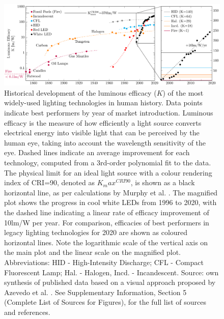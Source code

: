 \documentclass[journal=jacsat,manuscript=article]{achemso}
\begin{document}
\begin{figure}[h]
 \centering
 \includegraphics[width=\textwidth]{2_SSL_EST/article/figures/history_efficacy.pdf}
 \caption{Historical development of the luminous efficacy ($K$) of the most widely-used lighting technologies in human history. Data points indicate best performers by year of market introduction. Luminous efficacy is the measure of how efficiently a light source converts electrical energy into visible light that can be perceived by the human eye, taking into account the wavelength sensitivity of the eye. Dashed lines indicate an average improvement for each technology, computed from a 3rd-order polynomial fit to the data. The physical limit for an ideal light source with a colour rendering index of CRI=90, denoted as $K_max^{CRI90}$, is shown as a black horizontal line, as per calculations by Murphy et al. \cite{Murphy2012}. The magnified plot shows the progress in cool white LEDs from 1996 to 2020, with the dashed line indicating a linear rate of efficacy improvement of 10lm/W per year. For comparison, efficacies of best performers in legacy lighting technologies for 2020 are shown as coloured horizontal lines. Note the logarithmic scale of the vertical axis on the main plot and the linear scale on the magnified plot. Abbreviations: HID - High-Intensity Discharge; CFL - Compact Fluorescent Lamp; Hal. - Halogen, Incd. - Incandescent. Source: own synthesis of published data based on a visual approach proposed by Azevedo et al. \cite{azevedo2009transition}. See Supplementary Information, Section 5 (Complete List of Sources for Figures), for the full list of sources and references.}
 \label{fgr:history_efficacy}
\end{figure}
\end{document}
